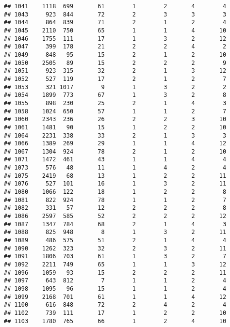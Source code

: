 \documentclass[]{article}
\begin{document}
\begin{verbatim}
## 1041    1118  699       61        1        2       4        4
## 1043     923  844       72        2        3       3        3
## 1044     864  839       71        2        1       2        4
## 1045    2110  750       65        1        1       4       10
## 1046    1755  111       17        1        3       2       12
## 1047     399  178       21        2        2       4        2
## 1049     848   95       15        2        1       2       10
## 1050    2505   89       15        2        2       2        9
## 1051     923  315       32        2        1       3       12
## 1052     527  119       17        2        1       2        7
## 1053     321 1017        9        1        3       2        2
## 1054    1899  773       67        1        3       2        8
## 1055     898  230       25        2        1       4        3
## 1058    1024  650       57        1        1       2        7
## 1060    2343  236       26        2        2       3       10
## 1061    1481   90       15        1        2       2       10
## 1064    2231  338       33        2        1       3        3
## 1066    1389  269       29        1        1       4       12
## 1067    1304  924       78        2        1       2       10
## 1071    1472  461       43        1        1       4        4
## 1073     576   48       11        1        4       2        4
## 1075    2419   68       13        1        2       2       11
## 1076     527  101       16        1        3       2       11
## 1080    1066  122       18        1        2       2        8
## 1081     822  924       78        1        1       2        7
## 1082     331   57       12        2        2       2        8
## 1086    2597  585       52        2        2       2       12
## 1087    1347  784       68        2        1       4        3
## 1088     825  948        8        1        3       2       11
## 1089     486  575       51        2        1       4        4
## 1090    1262  323       32        2        3       2       11
## 1091    1806  703       61        1        3       2        7
## 1092    2211  749       65        1        1       3       12
## 1096    1059   93       15        2        2       2       11
## 1097     643  812        7        1        1       2        4
## 1098    1095   96       15        1        1       2        4
## 1099    2168  701       61        1        1       4       12
## 1100     616  848       72        2        4       2        4
## 1102     739  111       17        1        2       2       10
## 1103    1780  765       66        1        2       4       10

\end{verbatim}
\end{document}
